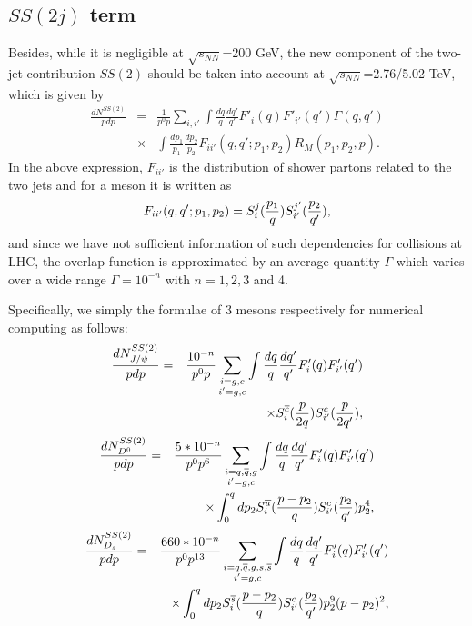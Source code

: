 \documentclass[twocolumn,aps,superscriptaddress,nofootinbib,floatfix]{revtex4}
\begin{document}
\subsection{$SS(2j)$ term}
Besides, while it is negligible at $\sqrt{s_{NN}}$=200 GeV, the new component of the two-jet contribution $SS(2)$ should be taken into account at $\sqrt{s_{NN}}$=2.76/5.02 TeV, which is given by \cite{Peng:2011zzd}
\begin{eqnarray}
	\frac{dN^{SS(2)}}{pdp}&=&\frac{1}{p^0p}\sum_{i,i'} \int \frac{dq}{q}\frac{dq'}{q'}F'_i(q)F'_{i'}(q')\Gamma(q,q')   \\ 
	&\times& \int\frac{dp_1}{p_1}\frac{dp_2}{p_2}F_{ii'}(q,q';p_1,p_2)R_M(p_1,p_2,p).\nonumber
\end{eqnarray}
In the above expression, $F_{ii′}$ is the distribution of shower partons related to the two jets
and for a meson it is written as
\begin{eqnarray}
	F_{ii'}(q,q';p_1,p_2)=S_i^j({p_1\over q})S_{i'}^{j'}({p_2\over q'}),
\end{eqnarray}
and since we have not sufficient information of such dependencies for collisions at
LHC, the overlap function is approximated by an average quantity $\Gamma$ which varies over a wide range  $\Gamma=10^{-n}$ with $n=1,2,3$ and 4.

Specifically, we simply the formulae of 3 mesons respectively for numerical computing as follows:
\begin{eqnarray}
	\frac{dN^{SS(2)}_{J/\psi}}{pdp}&=&\frac{10^{-n}}{p^0p}\sum_{\substack{i=g,c\\ i'=g,c}} \int \frac{dq}{q}\frac{dq'}{q'}F'_i(q)F'_{i'}(q')\nonumber \\
	&&\times  S_i^{\overline c}({p\over 2q})   S_{i'}^c({p\over 2q'}), \label{ss2_jpsi}
\end{eqnarray}
\begin{eqnarray}
	\frac{dN^{SS(2)}_{D^0}}{pdp}&=&\frac{5*10^{-n}}{p^0p^6}\sum_{\substack{i=q,\overline q,g\\ i'=g,c}} \int \frac{dq}{q}\frac{dq'}{q'}F'_i(q)F'_{i'}(q')\nonumber \\
	&&\times \int_0^q dp_2 S_i^{\overline u}({p-p_2\over q})   S_{i'}^c({p_2\over q'})p_2^4,
\end{eqnarray}
\begin{eqnarray}
	\frac{dN^{SS(2)}_{D_s}}{pdp}&=&\frac{660*10^{-n}}{p^0p^{13}}\sum_{\substack{i=q,\overline q,g,s,\overline s\\ i'=g,c}} \int \frac{dq}{q}\frac{dq'}{q'}F'_i(q)F'_{i'}(q')\nonumber \\
	&&\times \int_0^q dp_2 S_i^{\overline s}({p-p_2\over q})   S_{i'}^c({p_2\over q'})
	p_2^9(p-p_2)^2,
\end{eqnarray}
\end{document}
